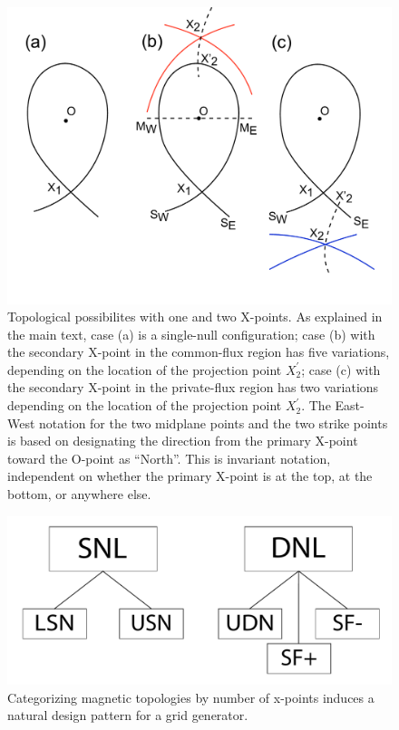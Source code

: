 \newpage

\begin{figure}[H]
    \centering
    \includegraphics[width=\linewidth]{figures/all_conf.pdf}

    \caption{Topological possibilites with one and two X-points. As
    explained in the main text, case (a) is a single-null
    configuration; case (b) with the secondary X-point in the
    common-flux region has five variations, depending on the location
    of the projection point $X_2^{\prime}$; case (c) with the
    secondary X-point in the private-flux region has two variations
    depending on the location of the projection point $X_2^{\prime}$.
    The East-West notation for the two midplane points and the two
    strike points is based on designating the direction from the
    primary X-point toward the O-point as ``North''. This is invariant
    notation, independent on whether the primary X-point is at the
    top, at the bottom, or anywhere else.}

    \label{fig:all_conf}
\end{figure}



\begin{figure}[H]
    \centering
    \includegraphics[width=\linewidth]{figures/config_group.pdf}
    \caption{Categorizing magnetic topologies by number of x-points induces a natural design pattern for a grid generator.}
    \label{fig:config_group}
\end{figure}

